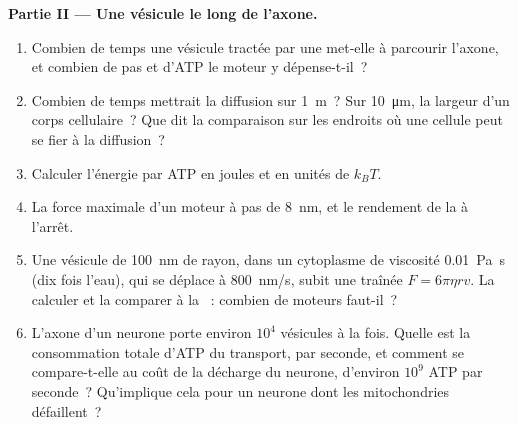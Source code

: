 \begin{problem}
\medskip
\noindent\textbf{Partie II --- Une vésicule le long de l'axone.}
\begin{enumerate}[resume]
  \item Combien de temps une vésicule tractée par une  met-elle
        à parcourir l'axone, et combien de pas et d'ATP le moteur y
        dépense-t-il~?
  \item Combien de temps mettrait la diffusion sur \qty{1}{m}~? Sur
        \qty{10}{\micro m}, la largeur d'un corps cellulaire~? Que dit
        la comparaison sur les endroits où une cellule peut se fier à
        la diffusion~?
  \item Calculer l'énergie par ATP en joules et en unités de $k_{B}T$.
  \item La force maximale d'un moteur à pas de \qty{8}{nm}, et le
        rendement de la  à l'arrêt.
  \item Une vésicule de \qty{100}{nm} de rayon, dans un cytoplasme de
        viscosité \qty{0.01}{Pa.s} (dix fois l'eau), qui se déplace à
        \qty{800}{nm/s}, subit une traînée $F = 6\pi\eta r v$. La
        calculer et la comparer à la ~: combien de moteurs
        faut-il~?
  \item L'axone d'un neurone porte environ $10^{4}$ vésicules à la
        fois. Quelle est la consommation totale d'ATP du transport, par
        seconde, et comment se compare-t-elle au coût de la décharge du
        neurone, d'environ $10^{9}$ ATP par seconde~? Qu'implique cela
        pour un neurone dont les mitochondries défaillent~?
\end{enumerate}


\end{problem}
